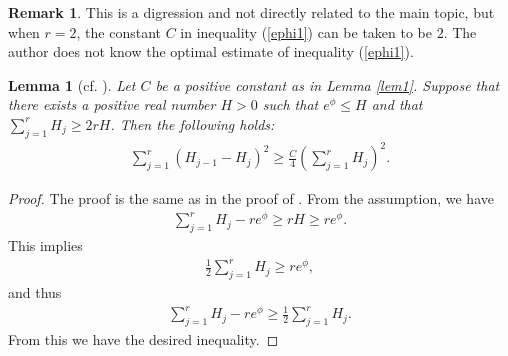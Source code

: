 \documentclass[12pt]{article}
\theoremstyle{definition}
\newtheorem{lemm}[defi]{Lemma}
\newtheorem{rem}[defi]{Remark}
\begin{document}
\begin{rem} 
This is a digression and not directly related to the main topic, but when $r=2$, the constant $C$ in inequality (\ref{ephi1}) can be taken to be $2$. The author does not know the optimal estimate of inequality (\ref{ephi1}).
\end{rem}
\begin{lemm}[cf. \cite{LM1, Sim2}]\label{lem2} {\it Let $C$ be a positive constant as in Lemma \ref{lem1}. Suppose that there exists a positive real number $H>0$ such that $e^\phi\leq H$ and that $\sum_{j=1}^rH_j\geq 2r H$. Then the following holds:
\begin{align*}
\sum_{j=1}^r(H_{j-1}-H_j)^2\geq \frac{C}{4}(\sum_{j=1}^rH_j)^2.
\end{align*}
}
\end{lemm}
\begin{proof} The proof is the same as in the proof of \cite[Lemma 3.6]{LM1}. From the assumption, we have
\begin{align*}
\sum_{j=1}^rH_j-re^\phi\geq rH \geq re^\phi.
\end{align*}
This implies
\begin{align*}
\frac{1}{2}\sum_{j=1}^r H_j \geq re^\phi,
\end{align*}
and thus 
\begin{align*}
\sum_{j=1}^rH_j-re^\phi\geq \frac{1}{2}\sum_{j=1}^r H_j.
\end{align*}
From this we have the desired inequality.
\end{proof}
\end{document}
